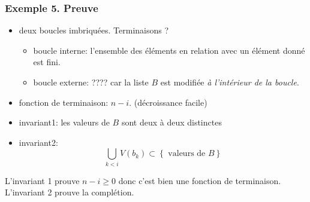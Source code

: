 \begin{frame}
  \frametitle{Exemple 5. Preuve}
\begin{itemize}
  \item deux boucles imbriquées. Terminaisons ?
  \begin{itemize}
    \item boucle interne: l'ensemble des éléments en relation avec un élément donné est fini.
    \item boucle externe: ???? car la liste $B$ est modifiée \emph{à l'intérieur de la boucle}.
  \end{itemize}
  \item fonction de terminaison: $n-i$. (décroissance facile)
  \item invariant1: \og les valeurs de $B$ sont deux à deux distinctes\fg~
  \item invariant2:
\begin{displaymath}
  \bigcup_{k< i}V(b_k) \subset \left\lbrace \text{ valeurs de }B \right\rbrace 
\end{displaymath}

\end{itemize}
L'invariant 1 prouve $n-i \geq 0$ donc c'est bien une fonction de terminaison. L'invariant 2 prouve la complétion.
\end{frame}



